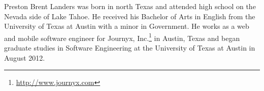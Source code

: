 \documentclass[12pt]{report}	%
\theoremstyle{definition}
\theoremstyle{remark}
\begin{document}



\begin{vita}
\renewcommand{\thefootnote}{\fnsymbol{footnote}}
Preston Brent Landers
was born in north Texas and attended high school on the Nevada side of Lake Tahoe. 
He received his Bachelor of Arts in English from the University of Texas at Austin with a minor in Government.
He works as a web and mobile software engineer for Journyx, Inc.\footnote[1]{\url{http://www.journyx.com}}
in Austin, Texas and began graduate studies in Software Engineering at 
the University of Texas at Austin in August 2012.

\end{vita}
\end{document}
